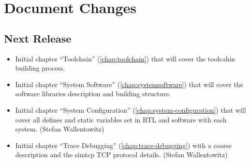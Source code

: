 \section*{Document Changes}

\subsection*{Next Release} %
\begin{itemize}
\item Initial chapter ``Toolchain'' (\ref{chap:toolchain}) that will
  cover the toolcahin building process.
\item Initial chapter ``System Software'' (\ref{chap:systemsoftware})
  that will cover the software libraries description and building structure.
\item Initial chapter ``System Configuration''
  (\ref{chap:system-configuration}) that will cover all defines and
  static variables set in RTL and software with each system. (Stefan Wallentowitz)
\item Initial chapter ``Trace Debugging'' (\ref{chap:trace-debugging})
  with a coarse description and the simtcp TCP protocol details.
  (Stefan Wallentowitz)
\end{itemize}


